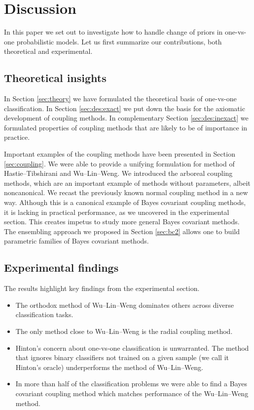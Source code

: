 \documentclass[pdflatex, sn-basic]{sn-jnl}%
\theoremstyle{thmstyleone}%
\theoremstyle{thmstyletwo}%
\theoremstyle{thmstylethree}%
\begin{document}
\section{Discussion}

In this paper we set out to investigate how to handle change of priors in one-vs-one 
probabilistic models. Let us first summarize our contributions, 
both theoretical and experimental.

\subsection{Theoretical insights}

In Section \ref{sec:theory} we have formulated the theoretical basis of 
one-vs-one classification. In Section \ref{sec:des:exact} we put down the basis 
for the axiomatic development of coupling methods. 
In complementary Section \ref{sec:des:inexact} we formulated properties 
of coupling methods that are likely to be of importance in practice.

Important examples of the coupling methods have been presented in Section \ref{sec:coupling}. We were able to provide a unifying formulation for method of Hastie--Tibshirani and Wu--Lin--Weng. We introduced the arboreal coupling methods, which are an important example of methods without parameters, albeit noncanonical. We recast the previously known normal coupling method in a new way. Although this is a canonical example of Bayes covariant coupling methods,  it is lacking in practical performance, as  we uncovered in the experimental section. This creates impetus to study more general Bayes covariant methods. The  ensembling approach we proposed in Section \ref{sec:bc2} allows one to build parametric families of Bayes covariant methods.

\subsection{Experimental findings} 

The results highlight key findings from the experimental section.

\begin{itemize}
	\item The orthodox method of Wu--Lin--Weng dominates others across diverse classification tasks.
	\item The only method close to Wu--Lin--Weng is the radial coupling method.
	\item Hinton's concern about one-vs-one classification is unwarranted. The method that ignores binary classifiers not trained on a given sample (we call it Hinton's oracle) underperforms the method of Wu--Lin--Weng.
	\item In more than half of the classification problems we were able to find a Bayes covariant coupling method which matches performance of the Wu--Lin--Weng method. 
\end{itemize}
\end{document}
